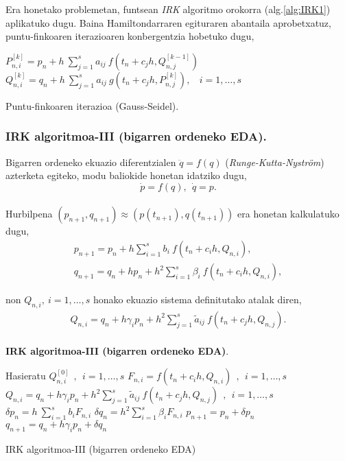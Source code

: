 Era honetako problemetan,  funtsean \emph{IRK} algoritmo orokorra (alg.\ref{alg:IRK1}) aplikatuko dugu. Baina Hamiltondarraren egituraren abantaila aprobetxatuz, puntu-finkoaren iterazioaren konbergentzia hobetuko dugu,   

\begin{algorithm}[H]
  {
   $P_{n,i}^{[k]}=p_{n}+ h \ \sum\limits_{j=1}^{s} a_{ij} \ f(t_n+c_jh,Q_{n,j}^{[k-1]})$\; 
   $Q_{n,i}^{[k]}=q_{n}+ h \ \sum\limits_{j=1}^{s} a_{ij} \ g(t_n+c_jh,P_{n,j}^{[k]}), \ \ \ \ i=1,\dots,s $\; 
  }
 \caption{Puntu-finkoaren iterazioa (Gauss-Seidel).}
\end{algorithm}
 

\subsubsection*{IRK algoritmoa-III (bigarren ordeneko EDA).}
 
 
Bigarren ordeneko ekuazio diferentzialen $\ddot{q}=f(q)$ (\emph{Runge-Kutta-Nyström}) azterketa egiteko, modu baliokide honetan idatziko dugu,
\begin{equation*}
\dot{p}=f(q), \ \ \dot{q}=p.
\end{equation*}

\paragraph*{}Hurbilpena $(p_{n+1},q_{n+1}) \approx (p(t_{n+1}),q(t_{n+1}))$ era honetan kalkulatuko dugu,
\begin{align*}
p_{n+1}=p_n+ h \sum\limits_{i=1}^{s} b_i \ f(t_n+c_ih,Q_{n,i}),\\
q_{n+1}=q_n+ h p_{n} + h^2 \sum\limits_{i=1}^{s} \beta_i \ f(t_n+c_ih,Q_{n,i}),
\end{align*}

non $Q_{n,i}, \ i=1,\dots,s$ honako ekuazio sistema definitutako atalak diren, 
\begin{align*}
Q_{n,i}=q_n+ h\gamma_i p_n+ h^2 \sum\limits_{j=1}^{s} \tilde{a}_{ij} \ f(t_n+c_jh,Q_{n,j}).
\end{align*}

\paragraph*{}{\textbf{IRK algoritmoa-III (bigarren ordeneko EDA)}.}


\begin{algorithm}[H]
 \BlankLine
  {
   \BlankLine
   Hasieratu  $Q_{n,i}^{[0]} \ \ , \ \ i=1,\dots,s $\;
    \BlankLine
   {
    \BlankLine 
    $F_{n,i}=f(t_n+c_ih,Q_{n,i}) \ \ , \ \  i=1,\dots,s$\;
    $Q_{n,i}=q_n+ h\gamma_i p_n+ h^2 \sum\limits_{j=1}^{s} \tilde{a}_{ij} \ f(t_n+c_jh,Q_{n,j}) \ \ , \ \  i=1,\dots,s$\;  
   }
   \BlankLine
    $\delta p_n=h \ \sum\limits_{i=1}^{s} b_i F_{n,i}$\;
    $\delta q_n=h^2 \sum\limits_{i=1}^{s} \beta_i F_{n,i}$\;    
    $p_{n+1}=p_{n}+ \delta p_n $\;
    $q_{n+1}=q_{n}+ h\gamma_i p_n+\delta q_n $\;
   \BlankLine
 }
 \caption{IRK algoritmoa-III (bigarren ordeneko EDA)}\label{alg:IRK2}
\end{algorithm}

